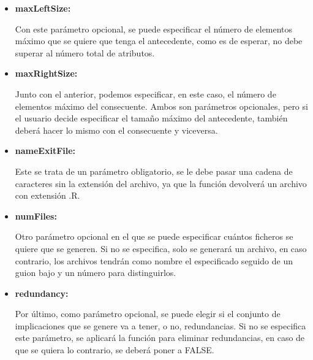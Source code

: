 \begin{itemize}
        Cabe especificar, que tanto este par\'ametro, como el anterior, se tratan de tama\~nos m\'aximos, es decir, que no todas las implicaciones 
        van a tener la diferencia exacta que se le especifique entre antecedente y consecuente, sino que el n\'umero o porcentaje ser\'a la 
        mayor diferencia que se encontrar\'a en el sistema de implicaciones.


        \item \textbf{maxLeftSize:}

        Con este par\'ametro opcional, se puede especificar el n\'umero de elementos m\'aximo que se quiere que tenga el antecedente, como 
        es de esperar, no debe superar al n\'umero total de atributos.


        \item \textbf{maxRightSize:}

        Junto con el anterior, podemos especificar, en este caso, el n\'umero de elementos m\'aximo del consecuente. Ambos son par\'ametros 
        opcionales, pero si el usuario decide especificar el tama\~no m\'aximo del antecedente, tambi\'en deber\'a hacer lo mismo con el 
        consecuente y viceversa.


        \item \textbf{nameExitFile:}

        Este se trata de un par\'ametro obligatorio, se le debe pasar una cadena de caracteres sin la extensi\'on del archivo, ya que 
        la funci\'on devolver\'a un archivo con extensi\'on .R.


        \item \textbf{numFiles:}

        Otro par\'ametro opcional en el que se puede especificar cu\'antos ficheros se quiere que se generen. Si no se especifica, 
        solo se generar\'a un archivo, en caso contrario, los archivos tendr\'an como nombre el especificado seguido de un guion bajo y un n\'umero 
        para distinguirlos.

        \item \textbf{redundancy:}

        Por \'ultimo, como par\'ametro opcional, se puede elegir si el conjunto de implicaciones que se genere va a tener, o no, redundancias. Si 
        no se especifica este par\'ametro, se aplicar\'a la funci\'on para eliminar redundancias, en caso de que se quiera lo contrario, se 
        deber\'a poner a FALSE.

    \end{itemize}

